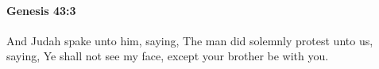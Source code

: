 
		\paragraph{Genesis 43:3} %
			\label{GENESIS-43-3}

			And Judah spake unto him, saying, The man did solemnly protest unto us, saying, Ye shall not see my face, except your brother be with you.


